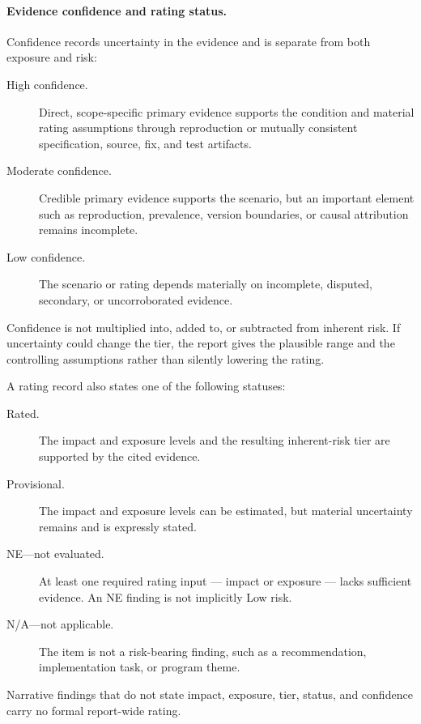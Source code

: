 \documentclass[../main.tex]{subfiles}
\begin{document}
\paragraph{Evidence confidence and rating status.}
Confidence records uncertainty in the evidence and is separate from both
exposure and risk:

\begin{description}
    \item[High confidence.] Direct, scope-specific primary evidence supports the
          condition and material rating assumptions through reproduction or
          mutually consistent specification, source, fix, and test artifacts.
    \item[Moderate confidence.] Credible primary evidence supports the scenario,
          but an important element such as reproduction, prevalence, version
          boundaries, or causal attribution remains incomplete.
    \item[Low confidence.] The scenario or rating depends materially on
          incomplete, disputed, secondary, or uncorroborated evidence.
\end{description}

Confidence is not multiplied into, added to, or subtracted from inherent risk.
If uncertainty could change the tier, the report gives the plausible range and
the controlling assumptions rather than silently lowering the rating.

A rating record also states one of the following statuses:

\begin{description}
    \item[Rated.] The impact and exposure levels and the resulting inherent-risk
          tier are supported by the cited evidence.
    \item[Provisional.] The impact and exposure levels can be estimated, but
          material uncertainty remains and is expressly stated.
    \item[NE---not evaluated.] At least one required rating input --- impact or
          exposure --- lacks sufficient evidence. An NE finding is not implicitly
          Low risk.
    \item[N/A---not applicable.] The item is not a risk-bearing finding, such as
          a recommendation, implementation task, or program theme.
\end{description}

Narrative findings that do not state impact, exposure, tier, status, and
confidence carry no formal report-wide rating.
\end{document}
